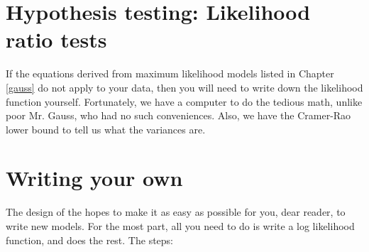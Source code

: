 \section{Hypothesis testing: Likelihood ratio tests} 
If the equations derived from maximum likelihood models listed in
Chapter \ref{gauss} do not apply to your data,
then you will need to write down the likelihood
function yourself.  Fortunately, we have a computer to do the tedious
math, unlike poor Mr. Gauss, who had no such conveniences.  Also, we
have the Cramer-Rao lower bound to tell us what the variances are.



\section{Writing your own}
The design of the  hopes to make it as easy as possible for you,
dear reader, to write new models. For the most part, all you need to
do is write a log likelihood function, and 
does the rest. The steps:


